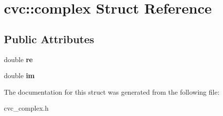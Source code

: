 \hypertarget{structcvc_1_1complex}{\section{cvc\-:\-:complex Struct Reference}
\label{structcvc_1_1complex}
}
\subsection*{Public Attributes}
\begin{DoxyCompactItemize}
\item 
\hypertarget{structcvc_1_1complex_a55a65b5252a29e568d804902a9d4a812}{double {\bfseries re}}\label{structcvc_1_1complex_a55a65b5252a29e568d804902a9d4a812}

\item 
\hypertarget{structcvc_1_1complex_a9354a1f9d3f0e588475a14b5f931e203}{double {\bfseries im}}\label{structcvc_1_1complex_a9354a1f9d3f0e588475a14b5f931e203}

\end{DoxyCompactItemize}


The documentation for this struct was generated from the following file\-:\begin{DoxyCompactItemize}
\item 
cvc\-\_\-complex.\-h\end{DoxyCompactItemize}
